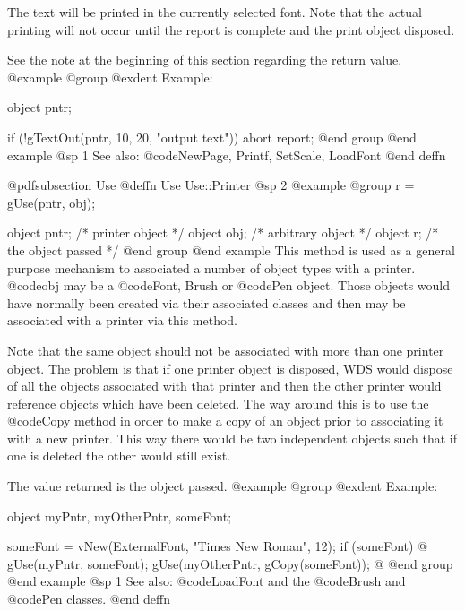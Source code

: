 The text will be printed in the currently selected font.  Note that the
actual printing will not occur until the report is complete and the
print object disposed.

See the note at the beginning of this section regarding the return value.
@example
@group
@exdent Example:

object  pntr;

if (!gTextOut(pntr, 10, 20, "output text"))
        abort report;
@end group
@end example
@sp 1
See also:  @code{NewPage, Printf, SetScale, LoadFont}
@end deffn







@pdfsubsection {Use}
@deffn {Use} Use::Printer
@sp 2
@example
@group
r = gUse(pntr, obj);

object  pntr;   /*  printer object     */
object  obj;    /*  arbitrary object   */
object  r;      /*  the object passed  */
@end group
@end example
This method is used as a general purpose mechanism to associated a
number of object types with a printer.  @code{obj} may be a @code{Font,
Brush} or @code{Pen} object.  Those objects would have normally been
created via their associated classes and then may be associated with a
printer via this method.

Note that the same object should not be associated with more than one
printer object.  The problem is that if one printer object is disposed, WDS
would dispose of all the objects associated with that printer and then the
other printer would reference objects which have been deleted.  The way
around this is to use the @code{Copy} method in order to make a copy of
an object prior to associating it with a new printer.  This way there would
be two independent objects such that if one is deleted the other would
still exist.

The value returned is the object passed.
@example
@group
@exdent Example:

object  myPntr, myOtherPntr, someFont;

someFont = vNew(ExternalFont, "Times New Roman", 12);
if (someFont)  @{
        gUse(myPntr, someFont);
        gUse(myOtherPntr, gCopy(someFont));
@}
@end group
@end example
@sp 1
See also:  @code{LoadFont} and the @code{Brush} and @code{Pen} classes.
@end deffn












